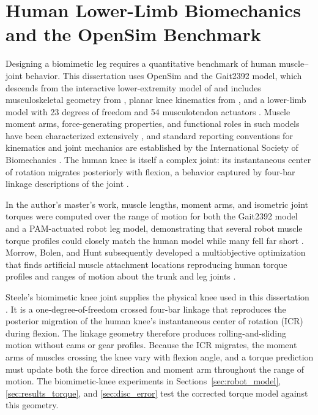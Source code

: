 \section{Human Lower-Limb Biomechanics and the OpenSim Benchmark}\label{sec:bg_biomechanics}

Designing a biomimetic leg requires a quantitative benchmark of human muscle--joint behavior. This dissertation uses OpenSim \citep{delp_opensim_2007, seth_opensim_2011, seth_opensim_2018} and the Gait2392 model, which descends from the interactive lower-extremity model of \citet{delp_interactive_1990} and includes musculoskeletal geometry from \citet{hoy_musculoskeletal_1990}, planar knee kinematics from \citet{yamaguchi_planar_1989}, and a lower-limb model with 23 degrees of freedom and 54 musculotendon actuators \citep{arnold_model_2010}. Muscle moment arms, force-generating properties, and functional roles in such models have been characterized extensively \citep{zajac_determining_1989, brand_model_1982, menegaldo_moment_2004, millard_flexing_2013, sherman_what_2013, suderman_moving_2012}, and standard reporting conventions for kinematics and joint mechanics are established by the International Society of Biomechanics \citep{wu_for_1995, wu_isb_2002, wu_isb_2005, derrick_isb_2020}. The human knee is itself a complex joint: its instantaneous center of rotation migrates posteriorly with flexion, a behavior captured by four-bar linkage descriptions of the joint \citep{romero_four-bar_2020, steele_biomimetic_2018}.

In the author's master's work, muscle lengths, moment arms, and isometric joint torques were computed over the range of motion for both the Gait2392 model and a PAM-actuated robot leg model, demonstrating that several robot muscle torque profiles could closely match the human model while many fell far short \citep{bolen_bipedal_2019, bolen_determination_2019}. Morrow, Bolen, and Hunt subsequently developed a multiobjective optimization that finds artificial muscle attachment locations reproducing human torque profiles and ranges of motion about the trunk and leg joints \citep{morrow_optimization_2020}.

Steele's biomimetic knee joint supplies the physical knee used in this dissertation \citep{steele_development_2017, steele_biomimetic_2018, steele_biomimetic_2018-1}. It is a one-degree-of-freedom crossed four-bar linkage that reproduces the posterior migration of the human knee's instantaneous center of rotation (ICR) during flexion. The linkage geometry therefore produces rolling-and-sliding motion without cams or gear profiles. Because the ICR migrates, the moment arms of muscles crossing the knee vary with flexion angle, and a torque prediction must update both the force direction and moment arm throughout the range of motion. The biomimetic-knee experiments in Sections~\ref{sec:robot_model}, \ref{sec:results_torque}, and \ref{sec:disc_error} test the corrected torque model against this geometry.

